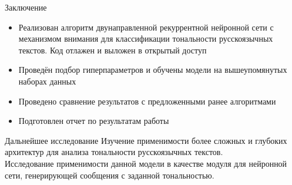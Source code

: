 \documentclass{beamer}
\begin{document}
\begin{frame}{Заключение}

	\begin{itemize}
		\item Реализован алгоритм двунаправленной рекуррентной нейронной сети с механизмом внимания для классификации тональности русскоязычных текстов. Код отлажен и выложен в открытый доступ
		\item Проведён подбор гиперпараметров и обучены модели на вышеупомянутых наборах данных
		\item Проведено сравнение результатов с предложенными ранее алгоритмами
		\item Подготовлен отчет по результатам работы
	\end{itemize}

	\begin{block}{Дальнейшее исследование}
		Изучение применимости более сложных и глубоких архитектур для анализа тональности русскоязычных текстов.\\
		Исследование применимости данной модели в качестве модуля для нейронной сети, генерирующей сообщения с заданной тональностью.
	\end{block}
\end{frame}
\end{document}
